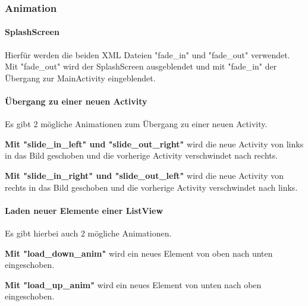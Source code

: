 \documentclass{scrartcl}
\begin{document}
\subsubsection{Animation}

\paragraph{SplashScreen} \mbox{} \newline

\noindent Hierfür werden die beiden XML Dateien "fade\_in" und "fade\_out" verwendet. Mit "fade\_out" wird der SplashScreen ausgeblendet und mit "fade\_in" der Übergang zur MainActivity eingeblendet.

\paragraph{Übergang zu einer neuen Activity} \mbox{} \newline 

\noindent Es gibt 2 mögliche Animationen zum Übergang zu einer neuen Activity. \newline 

\noindent \textbf{Mit "slide\_in\_left" und "slide\_out\_right"} wird die neue Activity von links in das Bild geschoben und die vorherige Activity verschwindet nach rechts. \newline 

\noindent \textbf{Mit "slide\_in\_right" und "slide\_out\_left"} wird die neue Activity von rechts in das Bild geschoben und die vorherige Activity verschwindet nach links. \newline 

\newpage

\paragraph{Laden neuer Elemente einer ListView} \mbox{} \newline

\noindent Es gibt hierbei auch 2 mögliche Animationen. \newline 

\noindent \textbf{Mit "load\_down\_anim"} wird ein neues Element von oben nach unten eingeschoben. \newline 

\noindent \textbf{Mit "load\_up\_anim"} wird ein neues Element von unten nach oben eingeschoben. \newline 
\end{document}
